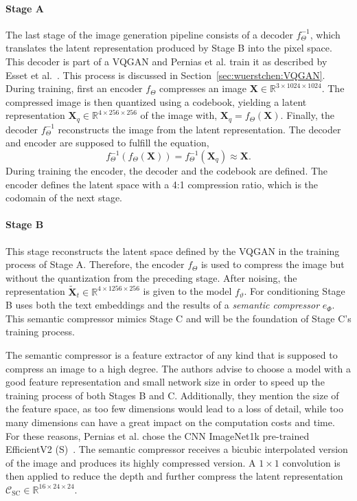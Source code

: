 \paragraph*{Stage A} The last stage of the image generation pipeline consists of a decoder
$f_{\Theta}^{-1}$, which translates the latent representation produced by Stage B into
the pixel space. This decoder is part of a VQGAN and Pernias et al. train it as
described by Esset et al.~\cite{esser2021tamingtransformershighresolutionimage}.
This process is discussed in Section~\ref{sec:wuerstchen:VQGAN}. During training,
first an encoder $f_{\Theta}$ compresses an image $\boldsymbol{X}\in\mathbb{R}^{3\times1024\times1024}$. The compressed image is
then quantized using a codebook, yielding a latent representation $\boldsymbol{X}_q\in\mathbb{R}^{4\times256\times256}$ of the image with,
$\boldsymbol{X}_q = f_{\Theta}(\boldsymbol{X}).$
Finally, the decoder $f_{\Theta}^{-1}$ reconstructs the image from the latent representation.
The decoder and encoder are supposed to fulfill the equation,
\begin{equation}
    f_{\Theta}^{-1}(f_{\Theta}(\boldsymbol{X})) = f_{\Theta}^{-1}(\boldsymbol{X}_q) \approx \boldsymbol{X}.
\end{equation}
During training the encoder, the decoder and the codebook are defined. The
encoder defines the latent space with a 4:1 compression ratio, which is
the codomain of the next stage.

\paragraph*{Stage B} This stage reconstructs the latent space defined by the
VQGAN in the training process of Stage A. Therefore, the encoder $f_{\Theta}$
is used to compress the image but without the quantization from the preceding stage.
After noising, the representation $\tilde{\boldsymbol{X}}_t\in\mathbb{R}^{4\times1256\times256}$
is given to the model $f_\vartheta$. For
conditioning Stage B uses both the text embeddings and the results of a
\emph{semantic compressor} $e_{\Phi}$. This semantic compressor mimics Stage C and will be
the foundation of Stage C's training process.

The semantic compressor is a feature extractor of any kind that is supposed to
compress an image to a high degree. The authors advise to choose a model with a
good feature representation and small network size in order to speed up the training
process of both Stages B and C. Additionally, they mention the size of the
feature space, as too few dimensions would lead to a loss of detail, while too
many dimensions can have a great impact on the computation costs and time. For
these reasons, Pernias et al. chose the CNN ImageNet1k pre-trained EfficientV2 (S)~\cite{Tan2021EfficientNetV2}.
The semantic compressor receives a bicubic interpolated version of the image and
produces its highly compressed version. A $1\times1$ convolution is then
applied to reduce the depth and further compress the latent representation $\mathcal{C}_{\text{SC}}\in\mathbb{R}^{16\times24\times24}$.


